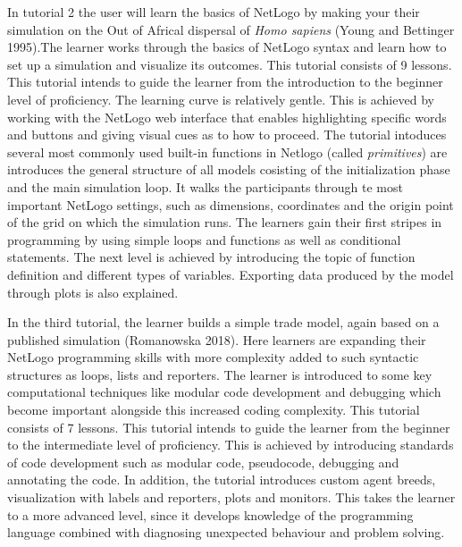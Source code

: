 \documentclass[
]{article}
\begin{document}
In tutorial 2 the user will learn the basics of NetLogo by making your their simulation on the Out of Africal dispersal of \emph{Homo sapiens} (Young and Bettinger 1995).The learner works through the basics of NetLogo syntax and learn how to set up a simulation and visualize its outcomes. This tutorial consists of 9 lessons. This tutorial intends to guide the learner from the introduction to the beginner level of proficiency. The learning curve is relatively gentle. This is achieved by working with the NetLogo web interface that enables highlighting specific words and buttons and giving visual cues as to how to proceed. The tutorial intoduces several most commonly used built-in functions in Netlogo (called \emph{primitives}) are introduces the general structure of all models cosisting of the initialization phase and the main simulation loop. It walks the participants through te most important NetLogo settings, such as dimensions, coordinates and the origin point of the grid on which the simulation runs. The learners gain their first stripes in programming by using simple loops and functions as well as conditional statements. The next level is achieved by introducing the topic of function definition and different types of variables. Exporting data produced by the model through plots is also explained.

In the third tutorial, the learner builds a simple trade model, again based on a published simulation (Romanowska 2018). Here learners are expanding their NetLogo programming skills with more complexity added to such syntactic structures as loops, lists and reporters. The learner is introduced to some key computational techniques like modular code development and debugging which become important alongside this increased coding complexity. This tutorial consists of 7 lessons. This tutorial intends to guide the learner from the beginner to the intermediate level of proficiency. This is achieved by introducing standards of code development such as modular code, pseudocode, debugging and annotating the code. In addition, the tutorial introduces custom agent breeds, visualization with labels and reporters, plots and monitors. This takes the learner to a more advanced level, since it develops knowledge of the programming language combined with diagnosing unexpected behaviour and problem solving.
\end{document}
